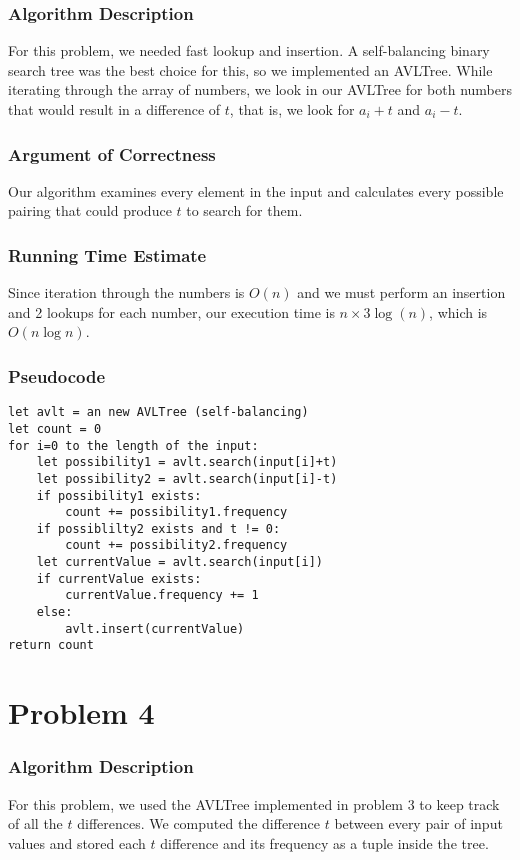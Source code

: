 \documentclass[letterpaper, 12pt]{math}
\begin{document}
\subsubsection*{Algorithm Description}
For this problem, we needed fast lookup and insertion. A self-balancing binary
search tree was the best choice for this, so we implemented an AVLTree.
While iterating through the array of numbers, we look in our AVLTree for both
numbers that would result in a difference of \( t \), that is, we look for
\( a_i+t \) and \( a_i-t \).

\subsubsection*{Argument of Correctness}
Our algorithm examines every element in the input and calculates every
possible pairing that could produce \( t \) to search for them.

\subsubsection*{Running Time Estimate} Since iteration through the numbers is
\( O(n) \) and we must perform an insertion and 2 lookups for each number, our
execution time is \( n\times3\log(n) \), which is \( O(n\log n) \).

\subsubsection*{Pseudocode}
\begin{lstlisting}
let avlt = an new AVLTree (self-balancing)
let count = 0
for i=0 to the length of the input:
    let possibility1 = avlt.search(input[i]+t)
    let possibility2 = avlt.search(input[i]-t)
    if possibility1 exists:
        count += possibility1.frequency
    if possiblilty2 exists and t != 0:
        count += possibility2.frequency
    let currentValue = avlt.search(input[i])
    if currentValue exists:
        currentValue.frequency += 1
    else:
        avlt.insert(currentValue)
return count
\end{lstlisting}

\section*{Problem 4}

\subsubsection*{Algorithm Description}
For this problem, we used the AVLTree implemented in problem 3 to keep track
of all the \( t \) differences. We computed the difference \( t \) between every
pair of input values and stored each \( t \) difference and its frequency as
a tuple inside the tree.
\end{document}
